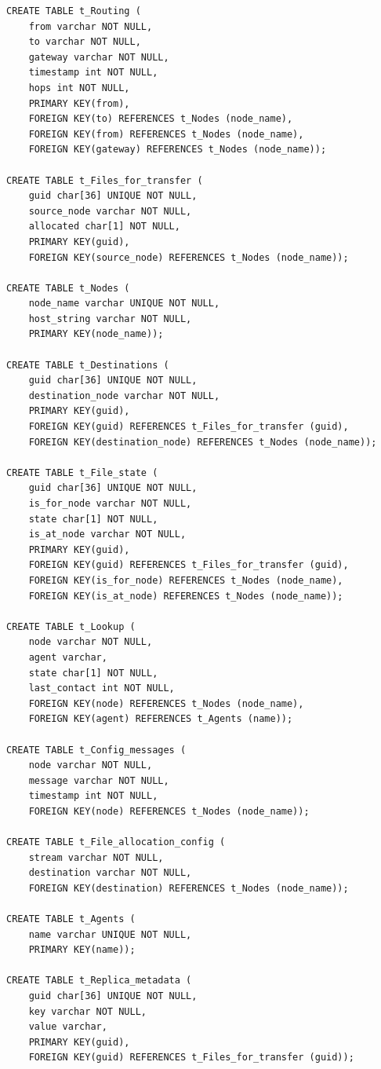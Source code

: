 \documentclass{cmspaper}
\begin{document}
{\small \begin{verbatim}
CREATE TABLE t_Routing (
	from varchar NOT NULL, 
	to varchar NOT NULL, 
	gateway varchar NOT NULL, 
	timestamp int NOT NULL, 
	hops int NOT NULL, 
	PRIMARY KEY(from),
	FOREIGN KEY(to) REFERENCES t_Nodes (node_name),
	FOREIGN KEY(from) REFERENCES t_Nodes (node_name),
	FOREIGN KEY(gateway) REFERENCES t_Nodes (node_name));

CREATE TABLE t_Files_for_transfer (
	guid char[36] UNIQUE NOT NULL, 
	source_node varchar NOT NULL, 
	allocated char[1] NOT NULL, 
	PRIMARY KEY(guid),
	FOREIGN KEY(source_node) REFERENCES t_Nodes (node_name));

CREATE TABLE t_Nodes (
	node_name varchar UNIQUE NOT NULL, 
	host_string varchar NOT NULL, 
	PRIMARY KEY(node_name));

CREATE TABLE t_Destinations (
	guid char[36] UNIQUE NOT NULL, 
	destination_node varchar NOT NULL, 
	PRIMARY KEY(guid),
	FOREIGN KEY(guid) REFERENCES t_Files_for_transfer (guid),
	FOREIGN KEY(destination_node) REFERENCES t_Nodes (node_name));

CREATE TABLE t_File_state (
	guid char[36] UNIQUE NOT NULL, 
	is_for_node varchar NOT NULL, 
	state char[1] NOT NULL, 
	is_at_node varchar NOT NULL, 
	PRIMARY KEY(guid),
	FOREIGN KEY(guid) REFERENCES t_Files_for_transfer (guid),
	FOREIGN KEY(is_for_node) REFERENCES t_Nodes (node_name),
	FOREIGN KEY(is_at_node) REFERENCES t_Nodes (node_name));

CREATE TABLE t_Lookup (
	node varchar NOT NULL, 
	agent varchar, 
	state char[1] NOT NULL, 
	last_contact int NOT NULL,
	FOREIGN KEY(node) REFERENCES t_Nodes (node_name),
	FOREIGN KEY(agent) REFERENCES t_Agents (name));

CREATE TABLE t_Config_messages (
	node varchar NOT NULL, 
	message varchar NOT NULL, 
	timestamp int NOT NULL,
	FOREIGN KEY(node) REFERENCES t_Nodes (node_name));

CREATE TABLE t_File_allocation_config (
	stream varchar NOT NULL, 
	destination varchar NOT NULL,
	FOREIGN KEY(destination) REFERENCES t_Nodes (node_name));

CREATE TABLE t_Agents (
	name varchar UNIQUE NOT NULL, 
	PRIMARY KEY(name));

CREATE TABLE t_Replica_metadata (
	guid char[36] UNIQUE NOT NULL, 
	key varchar NOT NULL, 
	value varchar, 
	PRIMARY KEY(guid),
	FOREIGN KEY(guid) REFERENCES t_Files_for_transfer (guid));


\end{verbatim}
}
\end{document}
